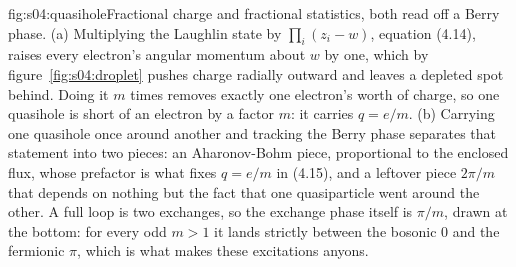 %
\begin{aqmfigure}{fig:s04:quasihole}{Fractional charge and fractional statistics, both read off a
Berry phase. (a) Multiplying the Laughlin state by $\prod_i(z_i-w)$, equation (4.14), raises every
electron's angular momentum about $w$ by one, which by figure~\ref{fig:s04:droplet} pushes charge
radially outward and leaves a depleted spot behind. Doing it $m$ times removes exactly one
electron's worth of charge, so one quasihole is short of an electron by a factor $m$: it carries
$q=e/m$. (b) Carrying one quasihole once around another and tracking the Berry phase separates
that statement into two pieces: an Aharonov-Bohm piece, proportional to the enclosed flux, whose
prefactor is what fixes $q=e/m$ in (4.15), and a leftover piece $2\pi/m$ that depends on nothing
but the fact that one quasiparticle went around the other. A full loop is two exchanges, so the
exchange phase itself is $\pi/m$, drawn at the bottom: for every odd $m>1$ it lands strictly
between the bosonic $0$ and the fermionic $\pi$, which is what makes these excitations anyons.}

\end{aqmfigure}

